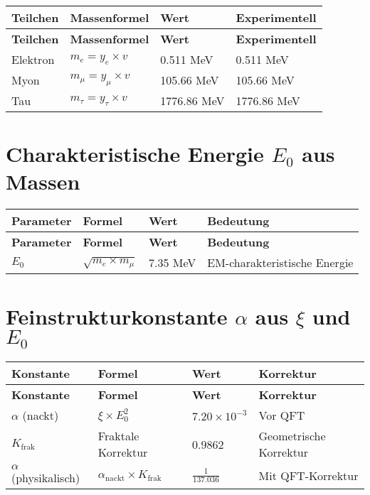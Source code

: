 \documentclass[12pt,a4paper]{article}
\begin{document}
	\begin{longtable}{|p{3cm}|p{4cm}|p{3cm}|p{3cm}|}
		\hline
		\textbf{Teilchen} & \textbf{Massenformel} & \textbf{Wert} & \textbf{Experimentell} \\
		\hline
		\endfirsthead
		\hline
		\textbf{Teilchen} & \textbf{Massenformel} & \textbf{Wert} & \textbf{Experimentell} \\
		\hline
		\endhead
		Elektron & \(m_e = y_e \times v\) & 0.511 MeV & 0.511 MeV \\
		\hline
		Myon & \(m_{\mu} = y_{\mu} \times v\) & 105.66 MeV & 105.66 MeV \\
		\hline
		Tau & \(m_{\tau} = y_{\tau} \times v\) & 1776.86 MeV & 1776.86 MeV \\
		\hline
	\end{longtable}
	
	\section{Charakteristische Energie \(E_0\) aus Massen}
	
	\begin{longtable}{|p{3cm}|p{4cm}|p{3cm}|p{4cm}|}
		\hline
		\textbf{Parameter} & \textbf{Formel} & \textbf{Wert} & \textbf{Bedeutung} \\
		\hline
		\endfirsthead
		\hline
		\textbf{Parameter} & \textbf{Formel} & \textbf{Wert} & \textbf{Bedeutung} \\
		\hline
		\endhead
		\(E_0\) & \(\sqrt{m_e \times m_{\mu}}\) & 7.35 MeV & EM-charakteristische Energie \\
		\hline
	\end{longtable}
	
	\section{Feinstrukturkonstante \(\alpha\) aus \(\xi\) und \(E_0\)}
	
	\begin{longtable}{|p{3cm}|p{4cm}|p{3cm}|p{3cm}|}
		\hline
		\textbf{Konstante} & \textbf{Formel} & \textbf{Wert} & \textbf{Korrektur} \\
		\hline
		\endfirsthead
		\hline
		\textbf{Konstante} & \textbf{Formel} & \textbf{Wert} & \textbf{Korrektur} \\
		\hline
		\endhead
		\(\alpha\) (nackt) & \(\xi \times E_0^2\) & \(7.20 \times 10^{-3}\) & Vor QFT \\
		\hline
		\(K_{\text{frak}}\) & Fraktale Korrektur & 0.9862 & Geometrische Korrektur \\
		\hline
		\(\alpha\) (physikalisch) & \(\alpha_{\text{nackt}} \times K_{\text{frak}}\) & \(\frac{1}{137.036}\) & Mit QFT-Korrektur \\
		\hline
	\end{longtable}
	
\end{document}
